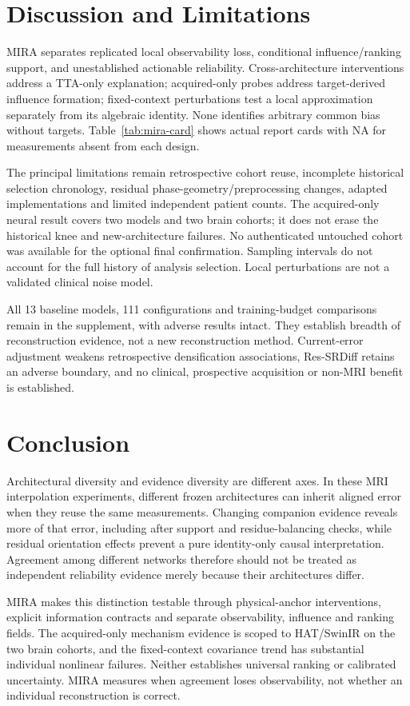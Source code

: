 \documentclass[10pt,twocolumn,letterpaper]{article}
\begin{document}


\section{Discussion and Limitations}
MIRA separates replicated local observability loss, conditional influence/ranking support, and unestablished actionable reliability. Cross-architecture interventions address a TTA-only explanation; acquired-only probes address target-derived influence formation; fixed-context perturbations test a local approximation separately from its algebraic identity. None identifies arbitrary common bias without targets. Table~\ref{tab:mira-card} shows actual report cards with NA for measurements absent from each design.

The principal limitations remain retrospective cohort reuse, incomplete historical selection chronology, residual phase-geometry/preprocessing changes, adapted implementations and limited independent patient counts. The acquired-only neural result covers two models and two brain cohorts; it does not erase the historical knee and new-architecture failures. No authenticated untouched cohort was available for the optional final confirmation. Sampling intervals do not account for the full history of analysis selection. Local perturbations are not a validated clinical noise model.

All 13 baseline models, 111 configurations and training-budget comparisons remain in the supplement, with adverse results intact. They establish breadth of reconstruction evidence, not a new reconstruction method. Current-error adjustment weakens retrospective densification associations, Res-SRDiff retains an adverse boundary, and no clinical, prospective acquisition or non-MRI benefit is established.

\section{Conclusion}
Architectural diversity and evidence diversity are different axes. In these MRI interpolation experiments, different frozen architectures can inherit aligned error when they reuse the same measurements. Changing companion evidence reveals more of that error, including after support and residue-balancing checks, while residual orientation effects prevent a pure identity-only causal interpretation. Agreement among different networks therefore should not be treated as independent reliability evidence merely because their architectures differ.

MIRA makes this distinction testable through physical-anchor interventions, explicit information contracts and separate observability, influence and ranking fields. The acquired-only mechanism evidence is scoped to HAT/SwinIR on the two brain cohorts, and the fixed-context covariance trend has substantial individual nonlinear failures. Neither establishes universal ranking or calibrated uncertainty. MIRA measures when agreement loses observability, not whether an individual reconstruction is correct.

\clearpage
{\small}
\end{document}

